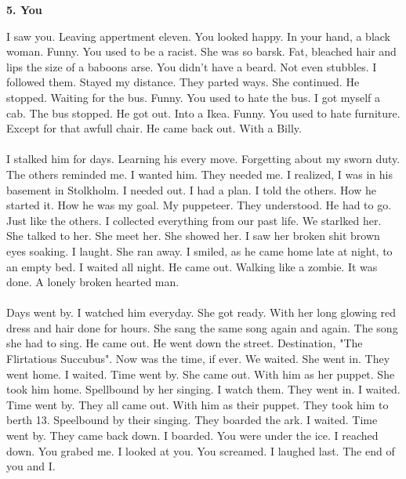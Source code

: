\documentclass[]{article}
\begin{document}
\newpage

\begin{center}
	\large\textbf{5. You}
\end{center}

I saw you. Leaving appertment eleven. You looked happy. In your hand, a black woman. Funny. You used to be a racist. She was so barsk. Fat, bleached hair and lips the size of a baboons arse. You didn't have a beard. Not even stubbles. I followed them. Stayed my distance. They parted ways. She continued. He stopped. Waiting for the bus. Funny. You used to hate the bus. I got myself a cab. The bus stopped. He got out. Into a Ikea. Funny. You used to hate furniture. Except for that awfull chair. He came back out. With a Billy.
\\ \\
I stalked him for days. Learning his every move. Forgetting about my sworn duty. The others reminded me. I wanted him. They needed me. I realized, I was in his basement in Stolkholm. I needed out. I had a plan. I told the others. How he started it. How he was my goal. My puppeteer. They understood. He had to go. Just like the others. I collected everything from our past life. We starlked her. She talked to her. She meet her. She showed her. I saw her broken shit brown eyes soaking. I laught. She ran away. I smiled, as he came home late at night, to an empty bed. I waited all night. He came out. Walking like a zombie. It was done. A lonely broken hearted man.
\\ \\
Days went by. I watched him everyday. She got ready. With her long glowing red dress and hair done for hours. She sang the same song again and again. The song she had to sing. He came out. He went down the street. Destination, "The Flirtatious Succubus". Now was the time, if ever. We waited. She went in. They went home. I waited. Time went by. She came out. With him as her puppet. She took him home. Spellbound by her singing. I watch them. They went in. I waited. Time went by. They all came out. With him as their puppet. They took him to berth 13. Speelbound by their singing. They boarded the ark. I waited. Time went by. They came back down. I boarded. You were under the ice. I reached down. You grabed me. I looked at you. You screamed. I laughed last. The end of you and I.
\end{document}
